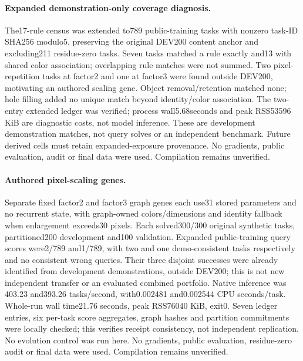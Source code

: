 \documentclass[11pt]{article}
\begin{document}
\paragraph{Expanded demonstration-only coverage diagnosis.}
The17-rule census was extended to789 public-training tasks with nonzero
task-ID SHA256 modulo5, preserving the original DEV200 content anchor and
excluding211 residue-zero tasks. Seven tasks matched a rule exactly and13
with shared color association; overlapping rule matches were not summed.
Two pixel-repetition tasks at factor2 and one at factor3 were found outside
DEV200, motivating an authored scaling gene. Object removal/retention matched
none; hole filling added no unique match beyond identity/color association.
The two-entry extended ledger was verified; process wall5.68seconds and peak
RSS53596 KiB are diagnostic costs, not model inference. These are development
demonstration matches, not query solves or an independent benchmark. Future
derived cells must retain expanded-exposure provenance. No gradients, public
evaluation, audit or final data were used. Compilation remains unverified.
\paragraph{Authored pixel-scaling genes.}
Separate fixed factor2 and factor3 graph genes each use31 stored parameters
and no recurrent state, with graph-owned colors/dimensions and identity fallback
when enlargement exceeds30 pixels. Each solved300/300 original synthetic tasks,
partitioned200 development and100 validation. Expanded public-training query
scores were2/789 and1/789, with two and one demo-consistent tasks respectively
and no consistent wrong queries. Their three disjoint successes were already
identified from development demonstrations, outside DEV200; this is not new
independent transfer or an evaluated combined portfolio. Native inference was
403.23 and393.26 tasks/second, with0.002481 and0.002544 CPU seconds/task.
Whole-run wall time21.76 seconds, peak RSS76040 KiB, exit0. Seven ledger entries,
six per-task score aggregates, graph hashes and partition commitments were
locally checked; this verifies receipt consistency, not independent replication.
No evolution control was run here. No gradients, public evaluation, residue-zero
audit or final data were used. Compilation remains unverified.
\end{document}
